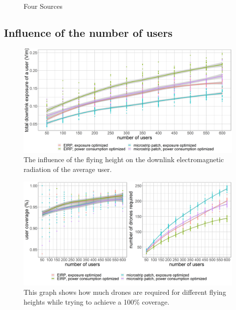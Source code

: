 \begin{figure}[]
  \caption{Four Sources}
  \label{fig:s3fhvssar}
\end{figure}

\FloatBarrier
\subsection{Influence of the number of users}

\begin{figure}[h!]
  \includegraphics[width=\textwidth]{../results/s3/uvsdl.png}
  \caption{The influence of the flying height on the downlink electromagnetic radiation of the average user.}
  \label{fig:s3fhvsdl}
\end{figure}


\begin{figure}[]
  \includegraphics[width=\textwidth]{../results/s3/uvsnumdronesAndCov.png}
  \caption{This graph shows how much drones are required for different flying heights while trying to achieve a 100\% coverage.}
  \label{fig:s3fhvscov}
\end{figure}


